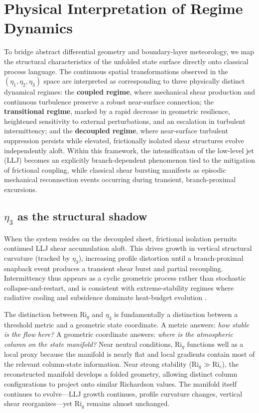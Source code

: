 \documentclass[12pt,a4paper]{article}
\newcommand{\Ric}{\mathrm{Ri}_c}
\newcommand{\Rig}{\mathrm{Ri}_g}
\begin{document}
\section{Physical Interpretation of Regime Dynamics}

To bridge abstract differential geometry and boundary-layer meteorology, we map the structural characteristics of the unfolded state surface directly onto classical process language. The continuous spatial transformations observed in the $(\eta_1, \eta_2, \eta_3)$ space are interpreted as corresponding to three physically distinct dynamical regimes: the \textbf{coupled regime}, where mechanical shear production and continuous turbulence preserve a robust near-surface connection; the \textbf{transitional regime}, marked by a rapid decrease in geometric resilience, heightened sensitivity to external perturbations, and an escalation in turbulent intermittency; and the \textbf{decoupled regime}, where near-surface turbulent suppression persists while elevated, frictionally isolated shear structures evolve independently aloft. Within this framework, the intensification of the low-level jet (LLJ) becomes an explicitly branch-dependent phenomenon tied to the mitigation of frictional coupling, while classical shear bursting manifests as episodic mechanical reconnection events occurring during transient, branch-proximal excursions.

\subsection{\texorpdfstring{$\eta_3$}{eta3} as the structural shadow}

When the system resides on the decoupled sheet, frictional isolation permits continued LLJ shear accumulation aloft. This drives growth in vertical structural curvature (tracked by $\eta_3$), increasing profile distortion until a branch-proximal snapback event produces a transient shear burst and partial recoupling. Intermittency thus appears as a cyclic geometric process rather than stochastic collapse-and-restart, and is consistent with extreme-stability regimes where radiative cooling and subsidence dominate heat-budget evolution \citep{vignon2017}.

The distinction between $\Rig$ and $\eta_3$ is fundamentally a distinction between a threshold metric and a geometric state coordinate. A metric answers: \emph{how stable is the flow here?} A geometric coordinate answers: \emph{where is the atmospheric column on the state manifold?} Near neutral conditions, $\Rig$ functions well as a local proxy because the manifold is nearly flat and local gradients contain most of the relevant column-state information. Near strong stability ($\Rig \gg \Ric$), the reconstructed manifold develops a folded geometry, allowing distinct column configurations to project onto similar Richardson values. The manifold itself continues to evolve---LLJ growth continues, profile curvature changes, vertical shear reorganizes---yet $\Rig$ remains almost unchanged.
\end{document}
